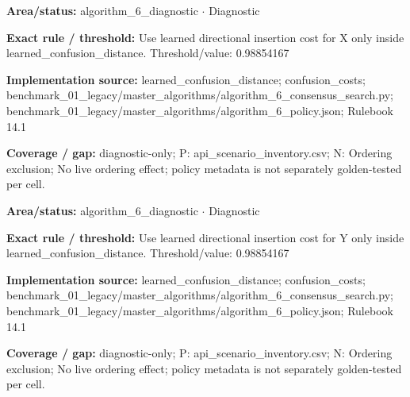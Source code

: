 \begin{tcolorbox}[enhanced,breakable,colback=white,colframe=Muted!45,boxrule=0.45pt,arc=1.5pt,left=6pt,right=6pt,top=5pt,bottom=5pt,title={\texttt{A6-LEARNED-INSERTION-X}},title after break={\texttt{A6-LEARNED-INSERTION-X}\ (continued)},fonttitle=\headingfont\bfseries\color{Navy},coltitle=Navy]
\textbf{Area/status:} algorithm\_\allowbreak{}6\_\allowbreak{}diagnostic $\boldsymbol{\cdot}$ Diagnostic\par
\smallskip
\textbf{Exact rule / threshold:} Use learned directional insertion cost for X only inside learned\_\allowbreak{}confusion\_\allowbreak{}distance. Threshold/\allowbreak{}value: 0.98854167\par
\smallskip
\textbf{Implementation source:} learned\_\allowbreak{}confusion\_\allowbreak{}distance; confusion\_\allowbreak{}costs; benchmark\_\allowbreak{}01\_\allowbreak{}legacy/\allowbreak{}master\_\allowbreak{}algorithms/\allowbreak{}algorithm\_\allowbreak{}6\_\allowbreak{}consensus\_\allowbreak{}search.py; benchmark\_\allowbreak{}01\_\allowbreak{}legacy/\allowbreak{}master\_\allowbreak{}algorithms/\allowbreak{}algorithm\_\allowbreak{}6\_\allowbreak{}policy.json; Rulebook 14.1\par
\smallskip
\textbf{Coverage / gap:} diagnostic-only; P: api\_\allowbreak{}scenario\_\allowbreak{}inventory.csv; N: Ordering exclusion; No live ordering effect; policy metadata is not separately golden-tested per cell.
\end{tcolorbox}
\begin{tcolorbox}[enhanced,breakable,colback=white,colframe=Muted!45,boxrule=0.45pt,arc=1.5pt,left=6pt,right=6pt,top=5pt,bottom=5pt,title={\texttt{A6-LEARNED-INSERTION-Y}},title after break={\texttt{A6-LEARNED-INSERTION-Y}\ (continued)},fonttitle=\headingfont\bfseries\color{Navy},coltitle=Navy]
\textbf{Area/status:} algorithm\_\allowbreak{}6\_\allowbreak{}diagnostic $\boldsymbol{\cdot}$ Diagnostic\par
\smallskip
\textbf{Exact rule / threshold:} Use learned directional insertion cost for Y only inside learned\_\allowbreak{}confusion\_\allowbreak{}distance. Threshold/\allowbreak{}value: 0.98854167\par
\smallskip
\textbf{Implementation source:} learned\_\allowbreak{}confusion\_\allowbreak{}distance; confusion\_\allowbreak{}costs; benchmark\_\allowbreak{}01\_\allowbreak{}legacy/\allowbreak{}master\_\allowbreak{}algorithms/\allowbreak{}algorithm\_\allowbreak{}6\_\allowbreak{}consensus\_\allowbreak{}search.py; benchmark\_\allowbreak{}01\_\allowbreak{}legacy/\allowbreak{}master\_\allowbreak{}algorithms/\allowbreak{}algorithm\_\allowbreak{}6\_\allowbreak{}policy.json; Rulebook 14.1\par
\smallskip
\textbf{Coverage / gap:} diagnostic-only; P: api\_\allowbreak{}scenario\_\allowbreak{}inventory.csv; N: Ordering exclusion; No live ordering effect; policy metadata is not separately golden-tested per cell.
\end{tcolorbox}
